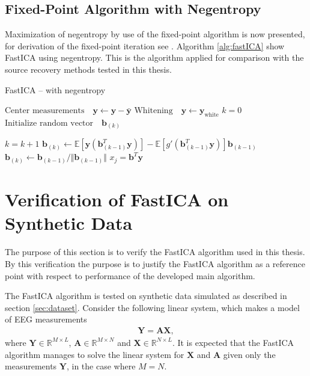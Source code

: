 \subsection{Fixed-Point Algorithm with Negentropy}
Maximization of negentropy by use of the fixed-point algorithm is now presented, for derivation of the fixed-point iteration see \cite[p. 188]{ICA}. Algorithm \ref{alg:fastICA} show FastICA using negentropy.
This is the algorithm applied for comparison with the source recovery methods tested in this thesis.    
\begin{algorithm}[H]
\caption{FastICA -- with negentropy }
\begin{algorithmic}[1]
			\State $\text{Center measurements} \quad \textbf{y} \gets \textbf{y} - \bar{\textbf{y}}$
			\State $\text{Whitening} \quad \textbf{y}\gets \textbf{y}_{\text{white}}$ 
			\EndProcedure  
			\State
			\State$k=0$            
            \State$\text{Initialize random vector} \quad \textbf{b}_{(k)}$ 
            
               		\State $k = k+1$
                	\State $\textbf{b}_{(k)} \gets \mathbb{E}[ \textbf{y}(\textbf{b}_{(k-1)}^T \textbf{y})] - \mathbb{E}[g'(\textbf{b}_{(k-1)}^T \textbf{y})] \textbf{b}_{(k-1)}$  
                	\State $\textbf{b}_{(k)} \gets \textbf{b}_{(k-1)}/\Vert \textbf{b}_{(k-1)} \Vert $ 
          		\EndWhile
          		\State $x_{j} = \textbf{b}^T\textbf{y}$
          	\EndFor
          	
            \EndProcedure
        \end{algorithmic} 
        \label{alg:fastICA}
\end{algorithm}

\section{Verification of FastICA on Synthetic Data}\label{app:ica_test}
The purpose of this section is to verify the FastICA algorithm used in this thesis. By this verification the purpose is to justify the FastICA algorithm as a reference point with respect to performance of the developed main algorithm.

The FastICA algorithm is tested on synthetic data simulated as described in section \ref{sec:dataset}. 
Consider the following linear system, which makes a model of EEG measurements 
\begin{align*}
\mathbf{Y} = \mathbf{AX},
\end{align*}
where $\mathbf{Y} \in \mathbb{R}^{M \times L}$, $\mathbf{A} \in \mathbb{R}^{M\times N}$ and $\mathbf{X} \in \mathbb{R}^{N \times L}$. 
It is expected that the FastICA algorithm manages to solve the linear system for $\mathbf{X}$ and $\mathbf{A}$ given only the measurements $\mathbf{Y}$, in the case where $M = N$.  

